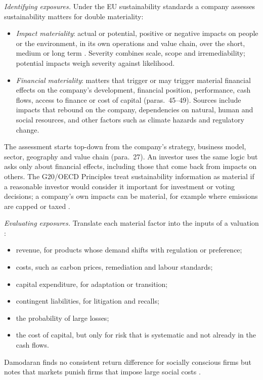 \begin{qfmethod}\label{meth:esg-exposure-evaluation}
 \emph{Identifying exposures.} Under the EU sustainability standards a company assesses sustainability matters for double materiality:
\begin{itemize}
\item \emph{Impact materiality}: actual or potential, positive or negative impacts on people or the environment, in its own operations and value chain, over the short, medium or long term \citep[Annex, ESRS~1 paras.~38--44]{eu-2026-1563-esrs}. Severity combines scale, scope and irremediability; potential impacts weigh severity against likelihood.
\item \emph{Financial materiality}: matters that trigger or may trigger material financial effects on the company's development, financial position, performance, cash flows, access to finance or cost of capital (paras.~45--49). Sources include impacts that rebound on the company, dependencies on natural, human and social resources, and other factors such as climate hazards and regulatory change.
\end{itemize}
The assessment starts top-down from the company's strategy, business model, sector, geography and value chain (para.~27). An investor uses the same logic but asks only about financial effects, including those that come back from impacts on others. The G20/OECD Principles treat sustainability information as material if a reasonable investor would consider it important for investment or voting decisions; a company's own impacts can be material, for example where emissions are capped or taxed \citep[principle~VI.A.1, p.~45]{oecd-g20-principles-2023}.

\emph{Evaluating exposures.} Translate each material factor into the inputs of a valuation \citep[Interpretation]{applied-corporate-finance-2014}:
\begin{itemize}
\item revenue, for products whose demand shifts with regulation or preference;
\item costs, such as carbon prices, remediation and labour standards;
\item capital expenditure, for adaptation or transition;
\item contingent liabilities, for litigation and recalls;
\item the probability of large losses;
\item the cost of capital, but only for risk that is systematic and not already in the cash flows.
\end{itemize}
Damodaran finds no consistent return difference for socially conscious firms but notes that markets punish firms that impose large social costs \citep[pp.~44--45]{applied-corporate-finance-2014}.


\end{qfmethod}
